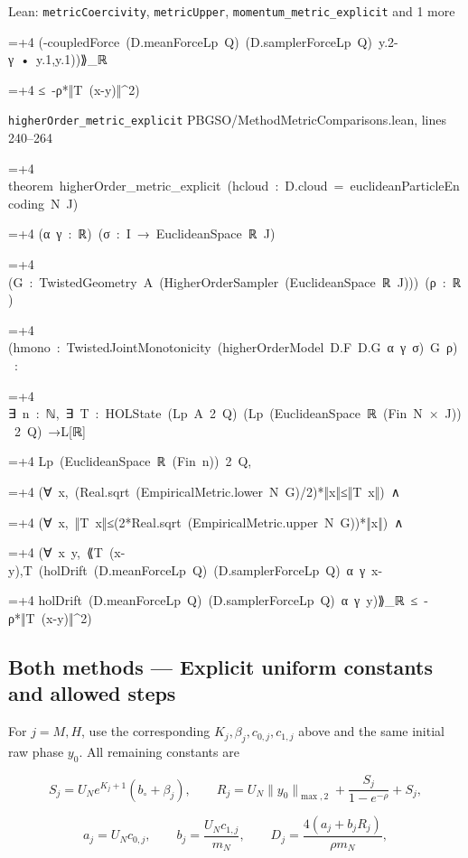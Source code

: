 \documentclass[11pt,a4paper]{report}
\newlength{\leancharwidth}
\newenvironment{leancode}{\par\smallskip\begingroup\ttfamily\footnotesize\raggedright
  \settowidth{\leancharwidth}{M}\setlength{\parskip}{0pt}\setlength{\parindent}{0pt}
  \frenchspacing}{\par\endgroup\smallskip}
\newcommand{\leanline}[2]{\hangindent=\dimexpr#1\leancharwidth+4\leancharwidth\relax
  \hangafter=1\noindent\hspace*{#1\leancharwidth}#2\par}
\newcommand{\leansource}[1]{\par{\footnotesize\color{leanmuted}#1}\par}
\begin{document}
\begin{leanbox}{Lean: \texttt{metricCoercivity}, \texttt{metricUpper}, \texttt{momentum\_\allowbreak{}metric\_\allowbreak{}explicit} and 1 more}
\begin{leancode}
\leanline{8}{(-coupledForce\ (D.meanForceLp\ Q)\ (D.samplerForceLp\ Q)\ y.2-γ\ •\ y.1,y.1)){\leanfallback ⟫}\_ℝ}
\leanline{10}{≤\ -ρ*‖T\ (x-y)‖\textasciicircum{}2)}
\end{leancode}
\leansource{\texttt{higherOrder\_\allowbreak{}metric\_\allowbreak{}explicit} \quad PBGSO/\allowbreak{}MethodMetricComparisons.lean, lines 240–264}
\begin{leancode}
\leanline{0}{theorem\ higherOrder\_metric\_explicit\ (hcloud\ :\ D.cloud\ =\ euclideanParticleEncoding\ N\ J)}
\leanline{4}{(α\ γ\ :\ ℝ)\ (σ\ :\ I\ →\ EuclideanSpace\ ℝ\ J)}
\leanline{4}{(G\ :\ TwistedGeometry\ A\ (HigherOrderSampler\ (EuclideanSpace\ ℝ\ J)))\ (ρ\ :\ ℝ)}
\leanline{4}{(hmono\ :\ TwistedJointMonotonicity\ (higherOrderModel\ D.F\ D.G\ α\ γ\ σ)\ G\ ρ)\ :}
\leanline{4}{∃\ n\ :\ ℕ,\ ∃\ T\ :\ HOLState\ (Lp\ A\ 2\ Q)\ (Lp\ (EuclideanSpace\ ℝ\ (Fin\ N\ ×\ J))\ 2\ Q)\ →L[ℝ]}
\leanline{8}{Lp\ (EuclideanSpace\ ℝ\ (Fin\ n))\ 2\ Q,}
\leanline{6}{(∀\ x,\ (Real.sqrt\ (EmpiricalMetric.lower\ N\ G)/2)*‖x‖≤‖T\ x‖)\ ∧}
\leanline{6}{(∀\ x,\ ‖T\ x‖≤(2*Real.sqrt\ (EmpiricalMetric.upper\ N\ G))*‖x‖)\ ∧}
\leanline{6}{(∀\ x\ y,\ {\leanfallback ⟪}T\ (x-y),T\ (holDrift\ (D.meanForceLp\ Q)\ (D.samplerForceLp\ Q)\ α\ γ\ x-}
\leanline{8}{holDrift\ (D.meanForceLp\ Q)\ (D.samplerForceLp\ Q)\ α\ γ\ y){\leanfallback ⟫}\_ℝ\ ≤\ -ρ*‖T\ (x-y)‖\textasciicircum{}2)}
\end{leancode}
\end{leanbox}
\subsection{\texorpdfstring{Both methods — Explicit uniform constants and allowed steps}{Both methods — Explicit uniform constants and allowed steps}}



For \(j=M,H\), use the corresponding \(K_j,\beta_j,c_{0,j},c_{1,j}\) above and the same initial raw phase \(y_0\). All remaining constants are





\[S_j=U_Ne^{K_j+1}(b_\circ+\beta_j),\qquad R_j=U_N\|y_0\|_{\max,2}+\frac{S_j}{1-e^{-\rho}}+S_j,\]







\[a_j=U_Nc_{0,j},\qquad b_j=\frac{U_Nc_{1,j}}{m_N},\qquad D_j=\frac{4(a_j+b_jR_j)}{\rho m_N},\]
\end{document}
